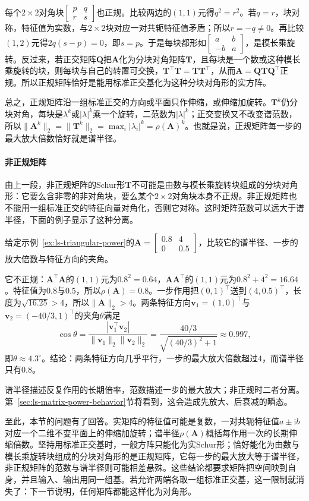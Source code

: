每个$2\times2$对角块$\left[\begin{smallmatrix}p&q\\r&s\end{smallmatrix}\right]$也正规。比较两边的$(1,1)$元得$q^2=r^2$。若$q=r$，块对称，特征值为实数，与$2\times2$块对应一对共轭特征值矛盾；所以$r=-q\neq0$。再比较$(1,2)$元得$2q(s-p)=0$，即$s=p$。于是每块都形如$\left[\begin{smallmatrix}a&b\\-b&a\end{smallmatrix}\right]$，是模长乘旋转。反过来，若正交矩阵$\bm Q$把$\bm A$化为分块对角矩阵$\bm T$，且每块是一个数或这种模长乘旋转的块，则每块与自己的转置可交换，$\bm T^\top\bm T=\bm T\bm T^\top$，从而$\bm A=\bm Q\bm T\bm Q^\top$正规。所以正规矩阵恰好是能用标准正交基化为这种分块对角形的实方阵。

总之，正规矩阵沿一组标准正交的方向或平面只作伸缩，或伸缩加旋转。$\bm T^k$仍分块对角，每块是$\lambda^k$或$|\lambda|^k$乘一个旋转，二范数为$|\lambda|^k$；正交变换又不改变谱范数，所以$\lVert\bm A^k\rVert_2=\lVert\bm T^k\rVert_2=\max_i|\lambda_i|^k=\rho(\bm A)^k$。也就是说，正规矩阵每一步的最大放大倍数恰好就是谱半径。

\paragraph{非正规矩阵}
由上一段，非正规矩阵的Schur形$\bm T$不可能是由数与模长乘旋转块组成的分块对角形：它要么含非零的非对角块，要么某个$2\times2$对角块本身不正规。非正规矩阵也不能用一组标准正交的特征向量对角化，否则它对称。这时矩阵范数可以远大于谱半径，下面的例子显示了这种分离。
\begin{example}[非正规矩阵的范数与谱半径]
\label{ex:ls-nonnormal-norm-radius}
给定示例~\ref{ex:ls-triangular-power}的$\bm A=\left[\begin{smallmatrix}0.8&4\\0&0.5\end{smallmatrix}\right]$，比较它的谱半径、一步的放大倍数与特征方向的夹角。

它不正规：$\bm A^\top\bm A$的$(1,1)$元为$0.8^2=0.64$，$\bm A\bm A^\top$的$(1,1)$元为$0.8^2+4^2=16.64$。特征值为$0.8$与$0.5$，所以$\rho(\bm A)=0.8$。一步作用把$(0,1)^\top$送到$(4,0.5)^\top$，长度为$\sqrt{16.25}>4$，所以$\lVert\bm A\rVert_2>4$。两条特征方向$\bm v_1=(1,0)^\top$与$\bm v_2=(-40/3,1)^\top$的夹角$\theta$满足
\[
 \cos\theta=\frac{|\bm v_1^\top\bm v_2|}{\lVert\bm v_1\rVert_2\lVert\bm v_2\rVert_2}
 =\frac{40/3}{\sqrt{(40/3)^2+1}}\approx0.997,
\]
即$\theta\approx4.3^\circ$。结论：两条特征方向几乎平行，一步的最大放大倍数超过$4$，而谱半径只有$0.8$。
\end{example}
谱半径描述反复作用的长期倍率，范数描述一步的最大放大；非正规时二者分离。第~\ref{sec:ls-matrix-power-behavior}节将看到，这会造成先放大、后衰减的瞬态。

至此，本节的问题有了回答。实矩阵的特征值可能是复数，一对共轭特征值$a\pm\mathrm ib$对应一个二维不变平面上的伸缩加旋转；谱半径$\rho(\bm A)$概括每作用一次的长期伸缩倍数。坚持用标准正交基时，一般方阵只能化为实Schur形；恰好能化为由数与模长乘旋转块组成的分块对角形的是正规矩阵，它每一步的最大放大等于谱半径，非正规矩阵的范数与谱半径则可能相差悬殊。这些结论都要求矩阵把空间映到自身，并且输入、输出用同一组基。若允许两端各取一组标准正交基，这一限制就消失了：下一节说明，任何矩阵都能这样化为对角形。
